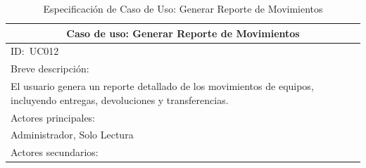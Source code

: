 \documentclass[stu, 12pt, letterpaper, donotrepeattitle, floatsintext, natbib]{apa7}
\begin{document}
\begin{longtable}{@{} p{16.5cm} @{}}
    \caption{Especificación de Caso de Uso: Generar Reporte de Movimientos}\label{tab:UC012}                                                                                                                                                                                       \\ \toprule
    \multicolumn{1}{c}{Caso de uso: Generar Reporte de Movimientos}                                                                                                                                                                                                                \\ \midrule
    ID:~UC012                                                                                                                                                                                                                                                                      \\ \midrule
    Breve descripción:                                                                                                                                                                                                                                                             \\
    El usuario genera un reporte detallado de los movimientos de equipos, incluyendo entregas, devoluciones y transferencias.                                                                                                                                                      \\ \midrule
    Actores principales:                                                                                                                                                                                                                                                           \\
    Administrador, Solo Lectura                                                                                                                                                                                                                                                    \\ \midrule
    Actores secundarios:                                                                                                                                                                                                                                                           \\

\end{longtable}
\end{document}
